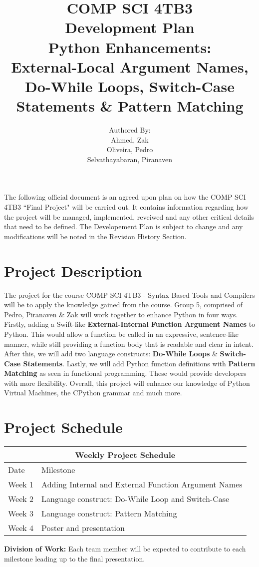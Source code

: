 \documentclass{article}
\title{COMP SCI 4TB3\\ Development Plan\\ Python Enhancements:\\External-Local Argument Names, Do-While Loops, Switch-Case Statements \& Pattern Matching}
\author{ Authored By:
		\\ Ahmed, Zak
		\\ Oliveira, Pedro
		\\ Selvathayabaran, Piranaven
}
\date{}
\begin{document}
\newpage

\maketitle

The following official document is an agreed upon plan on how the COMP SCI 4TB3 ``Final Project" will be carried out. It contains information regarding how the project will be managed, implemented, reveiwed and any other critical details that need to be defined. The Developement Plan is subject to change and any modifications will be noted in the Revision History Section. 

\tableofcontents 

\newpage 

\section {Project Description}
The project for the course COMP SCI 4TB3 - Syntax Based Tools and Compilers will be to apply the knowledge gained from the course. Group 5, comprised of Pedro, Piranaven \& Zak will work together to enhance Python in four ways. Firstly, adding a Swift-like \textbf{External-Internal Function Argument Names} to Python. This would allow a function be called in an expressive, sentence-like manner, while still providing a function body that is readable and clear in intent.  After this,  we will add two language constructs: \textbf{Do-While Loops} \& \textbf{Switch-Case Statements}. Lastly, we will add Python function definitions with \textbf{Pattern Matching} as seen in functional programming. These would provide developers with more flexibility. Overall, this project will enhance our knowledge of Python Virtual Machines, the CPython grammar and much more.
 
 \section{Project Schedule}

\begin{tabular}{ |p{2cm}|p{9cm}| }
 \hline
 \multicolumn{2}{|c|}{Weekly Project Schedule} \\
 \hline
 Date & Milestone \\
  \hline
Week 1 & Adding Internal and External Function Argument Names\\
Week 2 & Language construct: Do-While Loop and Switch-Case \\
Week 3 & Language construct: Pattern Matching\\
Week 4 & Poster and presentation \\
 \hline
\end{tabular}
\linebreak
\par{\textbf{Division of Work:} Each team member will be expected to contribute to each milestone leading up to the final presentation.}
 
\end{document}
